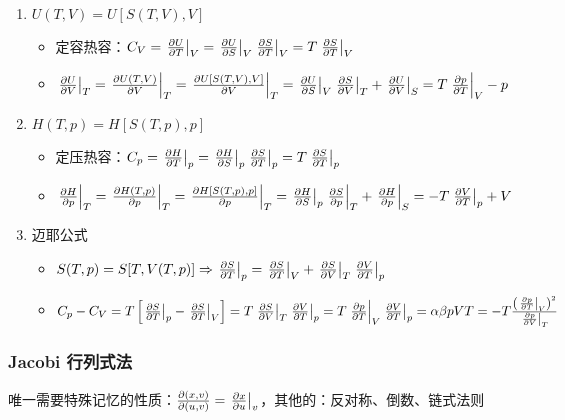 \begin{enumerate}
    \item $U(T, V) = U[S(T, V), V]$\begin{itemize}
              \item 定容热容：$C_V = \left.\pdv{U}{T}\right|_V = \left.\pdv{U}{S}\right|_V \left.\pdv{S}{T}\right|_V = T \left.\pdv{S}{T}\right|_V$
              \item $\left.\pdv{U}{V}\right|_T = \left.\pdv{U(T, V)}{V}\right|_T = \left.\pdv{U[S(T, V), V]}{V}\right|_T = \left.\pdv{U}{S}\right|_V \left.\pdv{S}{V}\right|_T + \left.\pdv{U}{V}\right|_S = T \left.\pdv{p}{T}\right|_V - p$
          \end{itemize}
    \item $H(T, p) = H[S(T, p), p]$\begin{itemize}
              \item 定压热容：$C_p = \left.\pdv{H}{T}\right|_p = \left.\pdv{H}{S}\right|_p \left.\pdv{S}{T}\right|_p = T \left.\pdv{S}{T}\right|_p$
              \item $\left.\pdv{H}{p}\right|_T = \left.\pdv{H(T, p)}{p}\right|_T = \left.\pdv{H[S(T, p), p]}{p}\right|_T = \left.\pdv{H}{S}\right|_p \left.\pdv{S}{p}\right|_T + \left.\pdv{H}{p}\right|_S = - T \left.\pdv{V}{T}\right|_p + V$
          \end{itemize}
    \item 迈耶公式\begin{itemize}
              \item $S(T, p) = S[T, V(T, p)] \Rightarrow \left.\pdv{S}{T}\right|_p = \left.\pdv{S}{T}\right|_V + \left.\pdv{S}{V}\right|_T \left.\pdv{V}{T}\right|_p$
              \item $C_p - C_V = T \left[\left.\pdv{S}{T}\right|_p - \left.\pdv{S}{T}\right|_V\right] = T \left.\pdv{S}{V}\right|_T \left.\pdv{V}{T}\right|_p = T \left.\pdv{p}{T}\right|_V \left.\pdv{V}{T}\right|_p = \alpha \beta p V T = - T \frac{\left(\left.\pdv{p}{T}\right|_V\right)^2}{\left.\pdv{p}{V}\right|_T}$
          \end{itemize}
\end{enumerate}

\subsubsection{Jacobi 行列式法}

唯一需要特殊记忆的性质：$\pdv{(x, v)}{(u, v)} = \left.\pdv{x}{u}\right|_v$，其他的：反对称、倒数、链式法则

